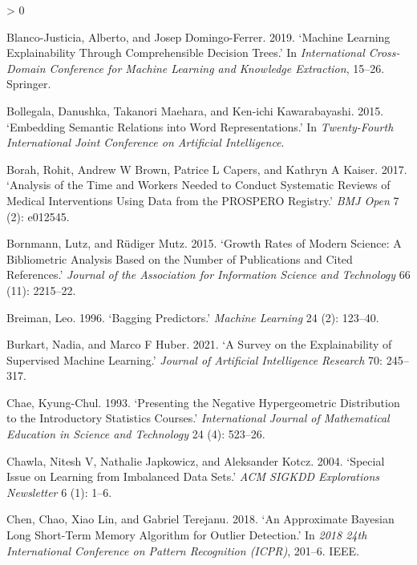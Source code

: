 \documentclass{article}
\newlength{\cslhangindent}
\newenvironment{CSLReferences}[2] %
 {%
  \setlength{\parindent}{0pt}
  \ifodd #1 \everypar{\setlength{\hangindent}{\cslhangindent}}\ignorespaces\fi
  \ifnum #2 > 0
  \setlength{\parskip}{#2\baselineskip}
  \fi
 }%
 {}
\begin{document}
\begin{CSLReferences}{1}{0}
\leavevmode\hypertarget{ref-blanco2019machine}{}%
Blanco-Justicia, Alberto, and Josep Domingo-Ferrer. 2019. {`Machine
Learning Explainability Through Comprehensible Decision Trees.'} In
\emph{International Cross-Domain Conference for Machine Learning and
Knowledge Extraction}, 15--26. Springer.

\leavevmode\hypertarget{ref-bollegala2015embedding}{}%
Bollegala, Danushka, Takanori Maehara, and Ken-ichi Kawarabayashi. 2015.
{`Embedding Semantic Relations into Word Representations.'} In
\emph{Twenty-Fourth International Joint Conference on Artificial
Intelligence}.

\leavevmode\hypertarget{ref-borah2017analysis}{}%
Borah, Rohit, Andrew W Brown, Patrice L Capers, and Kathryn A Kaiser.
2017. {`Analysis of the Time and Workers Needed to Conduct Systematic
Reviews of Medical Interventions Using Data from the PROSPERO
Registry.'} \emph{BMJ Open} 7 (2): e012545.

\leavevmode\hypertarget{ref-bornmann2015growth}{}%
Bornmann, Lutz, and Rüdiger Mutz. 2015. {`Growth Rates of Modern
Science: A Bibliometric Analysis Based on the Number of Publications and
Cited References.'} \emph{Journal of the Association for Information
Science and Technology} 66 (11): 2215--22.

\leavevmode\hypertarget{ref-breiman1996bagging}{}%
Breiman, Leo. 1996. {`Bagging Predictors.'} \emph{Machine Learning} 24
(2): 123--40.

\leavevmode\hypertarget{ref-burkart2021survey}{}%
Burkart, Nadia, and Marco F Huber. 2021. {`A Survey on the
Explainability of Supervised Machine Learning.'} \emph{Journal of
Artificial Intelligence Research} 70: 245--317.

\leavevmode\hypertarget{ref-chae1993presenting}{}%
Chae, Kyung-Chul. 1993. {`Presenting the Negative Hypergeometric
Distribution to the Introductory Statistics Courses.'}
\emph{International Journal of Mathematical Education in Science and
Technology} 24 (4): 523--26.

\leavevmode\hypertarget{ref-chawla2004special}{}%
Chawla, Nitesh V, Nathalie Japkowicz, and Aleksander Kotcz. 2004.
{`Special Issue on Learning from Imbalanced Data Sets.'} \emph{ACM
SIGKDD Explorations Newsletter} 6 (1): 1--6.

\leavevmode\hypertarget{ref-chen2018approximate}{}%
Chen, Chao, Xiao Lin, and Gabriel Terejanu. 2018. {`An Approximate
Bayesian Long Short-Term Memory Algorithm for Outlier Detection.'} In
\emph{2018 24th International Conference on Pattern Recognition (ICPR)},
201--6. IEEE.


\end{CSLReferences}
\end{document}
